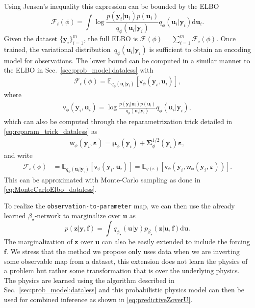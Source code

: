 \documentclass[11pt, fleqn]{article}
\def\cF{{\mathcal F}}
\def\y{{\mathbf y}}
\def\z{{\mathbf z}}
\def\fbf{{\mathbf f}}
\def\ubf{{\mathbf u}}
\def\cF{{\mathcal F}}
\def\bE{{\mathbb E}}
\def\md{{\mathrm d}}
\def \bmu {{\boldsymbol \mu}}
\def \bSigma {{\mathbf \Sigma}}
\def \bvarepsilon {\boldsymbol \varepsilon}
\begin{document}
Using Jensen's inequality this expression can be bounded by the \gls*{ELBO}
\begin{equation}\label{eq:ELBO_with_data}
   \cF_i(\phi) = \int \log \frac{p(\y_i|\ubf_i) p(\ubf_i)}{q_{\phi}(\ubf_i|\y_i)} q_{\phi}(\ubf_i | \y_i)  \md \ubf_i .
\end{equation}
Given the dataset $\{\y_i\}_{i=1}^m$, the full \gls*{ELBO} is $\cF(\phi) = \sum_{i=1}^m \cF_i(\phi)$.
Once trained, the variational distribution~$q_\phi (\ubf_i | \y_i)$ is sufficient to obtain an encoding model for observations. The lower bound can be computed in a similar manner to the \gls*{ELBO} in Sec.~\ref{sec:prob_model:dataless} with
\begin{align}
    \cF_i(\phi) = \bE_{q_\phi(\ubf_i | \y_i)}[\mathsf{v}_{\phi}(\y_i,\ubf_i)],
\end{align}
where
\begin{align}
    \mathsf{v}_{\phi}(\y_i,\ubf_i) = \log \frac{p(\y_i|\ubf_i) p(\ubf_i)}{q_{\phi}(\ubf_i|\y_i)} q_{\phi}(\ubf_i | \y_i),
\end{align}
which can also be computed through the reparametrization trick detailed in \eqref{eq:reparam_trick_dataless} as 
\begin{align}\label{eq:reparam_trick_data}
    \mathsf{w}_\phi(\y_i, \bvarepsilon) = \bmu_\phi(\y_i) + \bSigma^{1/2}_\phi(\y_i) \bvarepsilon,
\end{align}
and write
\begin{align}
        \cF_i(\phi) &= \bE_{q_\phi(\ubf_i | \y_i)}[\mathsf{v}_{\phi}(\y_i,\ubf_i)] =  
        \bE_{q(\bvarepsilon)}\left[\mathsf{v}_{\phi}(\y_i, \mathsf{w}_\phi(\y_i, \bvarepsilon))\right]\nonumber.
\end{align}
This can be approximated with Monte-Carlo sampling as done in \eqref{eq:MonteCarloElbo_dataless}.

To realize the \texttt{observation-to-parameter} map, we can then use the already learned $\beta_\star$-network to marginalize over $\ubf$ as 
\begin{equation}\label{eq:predictiveZoverU}
    p(\z|\y, \fbf) = \int q_{\phi_\star}(\ubf|\y)p_{\beta_\star}(\z|\ubf, \fbf)\md \ubf.
\end{equation}
The marginalization of $\z$ over $\ubf$ can also be easily extended to include the forcing $\fbf$. We stress that the method we propose only uses data when we are inverting some observable map from a dataset, this extension does not learn the physics of a problem but rather some transformation that is over the underlying physics. The physics are learned using the algorithm described in Sec.~\ref{sec:prob_model:dataless} and this probabilistic physics model can then be used for combined inference as shown in \eqref{eq:predictiveZoverU}.
\end{document}
